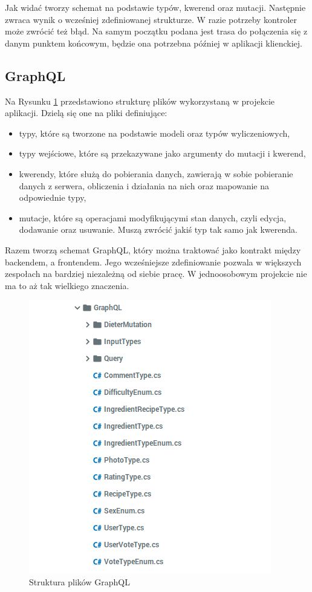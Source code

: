 Jak widać tworzy schemat na podstawie typów, kwerend oraz mutacji. Następnie zwraca wynik o wcześniej zdefiniowanej strukturze. W razie potrzeby kontroler może zwrócić też błąd. Na samym początku podana jest trasa do połączenia się z danym punktem końcowym, będzie ona potrzebna później w aplikacji klienckiej. 

\subsection{GraphQL}
Na Rysunku \ref{fig:graphql_table} przedstawiono strukturę plików wykorzystaną w projekcie aplikacji.
Dzielą się one na pliki definiujące:
\begin{itemize}
    \item typy, które są tworzone na podstawie modeli oraz typów wyliczeniowych,
    \item typy wejściowe, które są przekazywane jako argumenty do mutacji i kwerend,
    \item kwerendy, które służą do pobierania danych, zawierają w sobie pobieranie danych z serwera, obliczenia i działania na nich oraz mapowanie na odpowiednie typy,
    \item mutacje, które są operacjami modyfikującymi stan danych, czyli edycja, dodawanie oraz usuwanie. Muszą zwrócić jakiś typ tak samo jak kwerenda.
\end{itemize}
Razem tworzą schemat GraphQL, który można traktować jako kontrakt między backendem, a frontendem. Jego wcześniejsze zdefiniowanie pozwala w większych zespołach na bardziej niezależną od siebie pracę. W jednoosobowym projekcie nie ma to aż tak wielkiego znaczenia.

\begin{figure}[H]
\centering
\includegraphics[width=.7\textwidth]{rys/struktura-graphql.png}
\caption{Struktura plików GraphQL}
\label{fig:graphql_table}
\end{figure}

